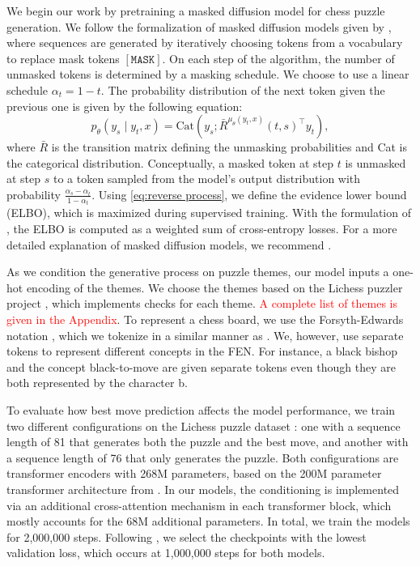 \documentclass[letterpaper]{article} %
\begin{document}
We begin our work by pretraining a masked diffusion model for chess puzzle generation. We follow the formalization of masked diffusion models given by \cite{shi2025simplifiedgeneralizedmaskeddiffusion}, where sequences are generated by iteratively choosing tokens from a vocabulary to replace mask tokens $[\mathtt{MASK}]$. On each step of the algorithm, the number of unmasked tokens is determined by a masking schedule. We choose to use a linear schedule $\alpha_t = 1 - t$. The probability distribution of the next token given the previous one is given by the following equation:
\begin{equation}
    p_\theta(y_s \mid y_t, x) = \text{Cat}(y_s; \bar{R}^{\mu_\theta(y_t, x)}(t, s)^\top y_t),
    \label{eq:reverse process}
\end{equation}
where $\bar{R}$ is the transition matrix defining the unmasking probabilities and Cat is the categorical distribution. Conceptually, a masked token at step $t$ is unmasked at step $s$ to a token sampled from the model's output distribution with probability $\frac{\alpha_s - \alpha_t}{1 - \alpha_t}$. Using \eqref{eq:reverse process}, we define the evidence lower bound (ELBO), which is maximized during supervised training. With the formulation of \cite{shi2025simplifiedgeneralizedmaskeddiffusion}, the ELBO is computed as a weighted sum of cross-entropy losses. For a more detailed explanation of masked diffusion models, we recommend \cite{shi2025simplifiedgeneralizedmaskeddiffusion}.

As we condition the generative process on puzzle themes, our model inputs a one-hot encoding of the themes. We choose the themes based on the Lichess puzzler project \cite{lichesspuzzler}, which implements checks for each theme. \textcolor{red}{A complete list of themes is given in the Appendix}. To represent a chess board, we use the Forsyth-Edwards notation \cite{fennotation}, which we tokenize in a similar manner as \cite{ruoss2024amortizedplanninglargescaletransformers,feng2025generatingcreativechesspuzzles}. We, however, use separate tokens to represent different concepts in the FEN. For instance, a black bishop and the concept black-to-move are given separate tokens even though they are both represented by the character b.

To evaluate how best move prediction affects the model performance, we train two different configurations on the Lichess puzzle dataset \cite{lichesspuzzledatabase}: one with a sequence length of 81 that generates both the puzzle and the best move, and another with a sequence length of 76 that only generates the puzzle. Both configurations are transformer encoders with 268M parameters, based on the 200M parameter transformer architecture from \cite{ruoss2024amortizedplanninglargescaletransformers}. In our models, the conditioning is implemented via an additional cross-attention mechanism in each transformer block, which mostly accounts for the 68M additional parameters. In total, we train the models for 2,000,000 steps. Following \cite{feng2025generatingcreativechesspuzzles}, we select the checkpoints with the lowest validation loss, which occurs at 1,000,000 steps for both models.
\end{document}
